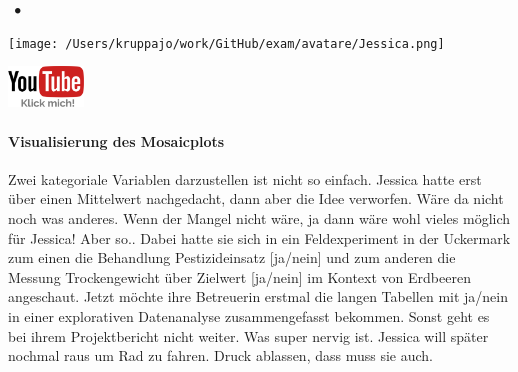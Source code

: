 \documentclass[a4paper, 9pt]{scrartcl}\usepackage[]{graphicx}\usepackage[]{xcolor}
\begin{document}
 
\ifcollection
\begin{flushright}
\tiny\vspace{-3Ex}
\textbf{\examinhaltstart}
\exammodulestat $\;\bullet$
\exammodulestatbbv 
\vspace{-4Ex}
\end{flushright}
\begin{minipage}[t]{0.5\textwidth}
\texttt{[image: /Users/kruppajo/work/GitHub/exam/avatare/Jessica.png]}
\end{minipage}
\begin{minipage}[t]{0.5\textwidth}
\hfill
\href{https://youtu.be/t_1KL77mfmg}{\includegraphics[width = 2cm]{img/youtube}}
\end{minipage}
\vspace{-3ex}
\fi



\ifcollection
\paragraph{Visualisierung des Mosaicplots}
\fi

Zwei kategoriale Variablen darzustellen ist nicht so einfach. Jessica hatte erst über einen Mittelwert nachgedacht, dann aber die Idee verworfen. Wäre da nicht noch was anderes. Wenn der Mangel nicht wäre, ja dann wäre wohl vieles möglich für Jessica! Aber so.. Dabei hatte sie sich in ein Feldexperiment in der Uckermark zum einen die Behandlung Pestizideinsatz [ja/nein] und zum anderen die Messung Trockengewicht über Zielwert [ja/nein] im Kontext von Erdbeeren angeschaut. Jetzt möchte ihre Betreuerin erstmal die langen Tabellen mit ja/nein in einer explorativen Datenanalyse zusammengefasst bekommen. Sonst geht es bei ihrem Projektbericht nicht weiter. Was super nervig ist. Jessica will später nochmal raus um Rad zu fahren. Druck ablassen, dass muss sie auch.



\vspace{1Ex}
\end{document}
